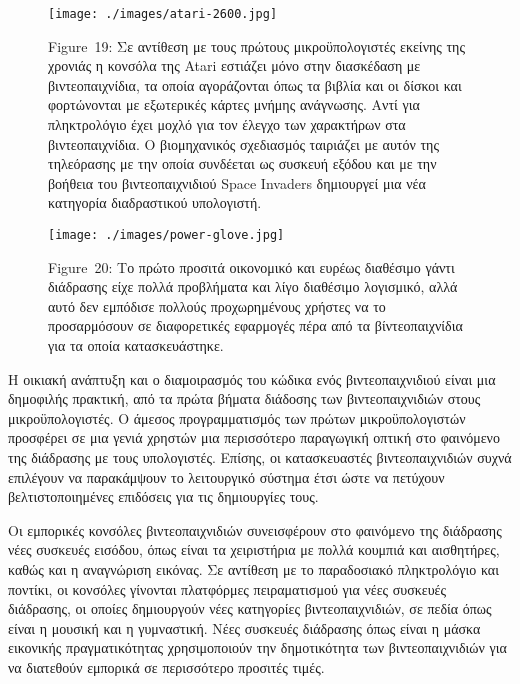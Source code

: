 \documentclass[
]{article}
\begin{document}
\leavevmode{}%
\begin{figure}
\hypertarget{fig:atari-2600}{%
\centering
\texttt{[image: ./images/atari-2600.jpg]}
\caption{Figure~19: Σε αντίθεση με τους πρώτους μικροϋπολογιστές εκείνης
της χρονιάς η κονσόλα της Atari εστιάζει μόνο στην διασκέδαση με
βιντεοπαιχνίδια, τα οποία αγοράζονται όπως τα βιβλία και οι δίσκοι και
φορτώνονται με εξωτερικές κάρτες μνήμης ανάγνωσης. Αντί για πληκτρολόγιο
έχει μοχλό για τον έλεγχο των χαρακτήρων στα βιντεοπαιχνίδια. Ο
βιομηχανικός σχεδιασμός ταιριάζει με αυτόν της τηλεόρασης με την οποία
συνδέεται ως συσκευή εξόδου και με την βοήθεια του βιντεοπαιχνιδιού
Space Invaders δημιουργεί μια νέα κατηγορία διαδραστικού
υπολογιστή.}\label{fig:atari-2600}
}
\end{figure}

\leavevmode{}%
\begin{figure}
\hypertarget{fig:power-glove}{%
\centering
\texttt{[image: ./images/power-glove.jpg]}
\caption{Figure~20: Το πρώτο προσιτά οικονομικό και ευρέως διαθέσιμο
γάντι διάδρασης είχε πολλά προβλήματα και λίγο διαθέσιμο λογισμικό, αλλά
αυτό δεν εμπόδισε πολλούς προχωρημένους χρήστες να το προσαρμόσουν σε
διαφορετικές εφαρμογές πέρα από τα βίντεοπαιχνίδια για τα οποία
κατασκευάστηκε.}\label{fig:power-glove}
}
\end{figure}

Η οικιακή ανάπτυξη και ο διαμοιρασμός του κώδικα ενός βιντεοπαιχνιδιού
είναι μια δημοφιλής πρακτική, από τα πρώτα βήματα διάδοσης των
βιντεοπαιχνιδιών στους μικροϋπολογιστές. Ο άμεσος προγραμματισμός των
πρώτων μικροϋπολογιστών προσφέρει σε μια γενιά χρηστών μια περισσότερο
παραγωγική οπτική στο φαινόμενο της διάδρασης με τους υπολογιστές.
Επίσης, οι κατασκευαστές βιντεοπαιχνιδιών συχνά επιλέγουν να παρακάμψουν
το λειτουργικό σύστημα έτσι ώστε να πετύχουν βελτιστοποιημένες επιδόσεις
για τις δημιουργίες τους.

Οι εμπορικές κονσόλες βιντεοπαιχνιδιών συνεισφέρουν στο φαινόμενο της
διάδρασης νέες συσκευές εισόδου, όπως είναι τα χειριστήρια με πολλά
κουμπιά και αισθητήρες, καθώς και η αναγνώριση εικόνας. Σε αντίθεση με
το παραδοσιακό πληκτρολόγιο και ποντίκι, οι κονσόλες γίνονται πλατφόρμες
πειραματισμού για νέες συσκευές διάδρασης, οι οποίες δημιουργούν νέες
κατηγορίες βιντεοπαιχνιδιών, σε πεδία όπως είναι η μουσική και η
γυμναστική. Νέες συσκευές διάδρασης όπως είναι η μάσκα εικονικής
πραγματικότητας χρησιμοποιούν την δημοτικότητα των βιντεοπαιχνιδιών για
να διατεθούν εμπορικά σε περισσότερο προσιτές τιμές.
\end{document}
